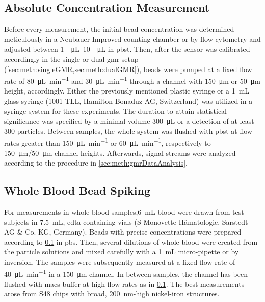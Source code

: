 \subsection{Absolute Concentration Measurement}
\label{sec:meth:conc}
Before every measurement, the initial bead concentration was determined meticulously in a Neubauer Improved counting chamber or by flow cytometry and adjusted between \SIrange{1}{10}{\per\micro\liter} in \gls{pbst}. Then, after the sensor was calibrated accordingly in the single or dual \gls{gmr}-setup (\cref{sec:meth:singleGMR,sec:meth:dualGMR}), beads were pumped at a fixed flow rate of \SI{80}{\micro\liter\per\minute} and \SI{30}{\micro\liter\per\minute} through a channel with \SI{150}{\micro\meter} or \SI{50}{\micro\meter} height, accordingly. Either the previously mentioned plastic syringe or a \SI{1}{\milli\liter} glass syringe (1001 TLL, Hamilton Bonaduz AG, Switzerland) was utilized in a syringe system for these experiments. The duration to attain statistical significance was specified by a minimal volume \SI{300}{\micro\liter} or a detection of at least \num{300} particles. Between samples, the whole system was flushed with \gls{pbst} at flow rates greater than \SI{150}{\micro\liter\per\minute} or \SI{60}{\micro\liter\per\minute}, respectively to \SI{150}{\micro\meter}/\SI{50}{\micro\meter} channel heights. Afterwards, signal streams were analyzed according to the procedure in \cref{sec:meth:gmrDataAnalysis}.

\subsection{Whole Blood Bead Spiking}
For measurements in whole blood samples,\SI{6}{\milli\liter} blood were drawn from test subjects in \SI{7.5}{\milli\liter}, \gls{edta}-containing vials (S-Monovette Hämatologie, Sarstedt AG \& Co. KG, Germany). Beads with precise concentrations were prepared according to \cref{sec:meth:conc} in \gls{pbs}. Then, several dilutions of whole blood were created from the particle solutions and mixed carefully with a \SI{1}{\milli\liter} micro-pipette or by inversion. The samples were subsequently measured at a fixed flow rate of \SI{40}{\micro\liter\per\minute} in a \SI{150}{\micro\meter} channel. In between samples, the channel has been flushed with \gls{macs} buffer at high flow rates as in \cref{sec:meth:conc}. The best measurements arose from S48 chips with broad, \SI{200}{\nano\meter}-high nickel-iron structures.

